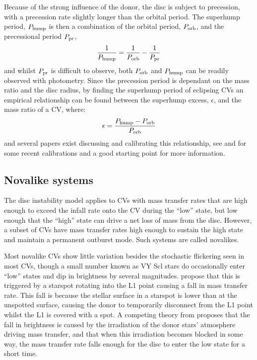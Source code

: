 Because of the strong influence of the donor, the disc is subject to precession, with a precession rate slightly longer than the orbital period. The superhump period, $P_{\rm hump}$ is then a combination of the orbital period, $P_{\rm orb}$, and the precessional period $P_{\rm pr}$,
\begin{equation}
    \frac{1}{P_{\rm hump}} = \frac{1}{P_{\rm orb}} - \frac{1}{P_{\rm pr}}
\end{equation}
and whilst $P_{\rm pr}$ is difficult to observe, both $P_{\rm orb}$ and $P_{\rm hump}$ can be readily observed with photometry. Since the precession period is dependant on the mass ratio and the disc radius, by finding the superhump period of eclipsing CVs an empirical relationship can be found between the superhump excess, $\epsilon$, and the mass ratio of a CV, where:
\begin{equation}
    \epsilon = \frac{P_{\rm hump} - P_{\rm orb}}{P_{\rm orb}}
\end{equation}
and several papers exist discussing and calibrating this relationship, see \citet{McAllister2019} and \citet{kato2022} for some recent calibrations and a good starting point for more information.


\subsection{Novalike systems}

The disc instability model applies to CVs with mass transfer rates that are high enough to exceed the infall rate onto the CV during the ``low'' state, but low enough that the ``high'' state can drive a net loss of mass from the disc. However, a subset of CVs have mass transfer rates high enough to sustain the high state and maintain a permanent outburst mode. Such systems are called novalikes.

Most novalike CVs show little variation besides the stochastic flickering seen in most CVs, though a small number known as VY Scl stars do occasionally enter ``low'' states and dip in brightness by several magnitudes. \citet{livio1994} propose that this is triggered by a starspot rotating into the L1 point causing a fall in mass transfer rate. This fall is because the stellar surface in a starspot is lower than at the unspotted surface, causing the donor to temporarily disconnect from the L1 point whilst the L1 is covered with a spot.
A competing theory from \citet{wu1995} proposes that the fall in brightness is caused by the irradiation of the donor stars' atmosphere driving mass transfer, and that when this irradiation becomes blocked in some way, the mass transfer rate falls enough for the disc to enter the low state for a short time.


